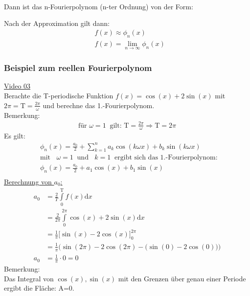 Dann ist das n-Fourierpolynom (n-ter Ordnung) von der Form:\\
\begin{center}
\end{center}
Nach der Approximation gilt dann:\\
\begin{align*}
&f(x)\approx \phi_n(x)\\
&f(x)=\lim\limits_ {n\to\infty}\phi_n(x)
\end{align*}
\addtocounter{subsubsection}{1}
\subsubsection{ Beispiel zum reellen Fourierpolynom}
\href{https://youtu.be/EsfssnLs8To}{Video 03}\\
Berachte die T-periodische Funktion $ f(x)=\cos(x)+2\sin(x) $ mit $ 2\pi=\mathrm{T}=\frac{2\pi}{\omega} $ und berechne das 1.-Fourierpolynom.\\
Bemerkung:\\
\begin{align*}
\text{für } \omega=1 \;\;\text{gilt: } \mathrm{T}=\frac{2\pi}{\omega}\Rightarrow \mathrm{T}=2\pi
\end{align*}
Es gilt:\\
\begin{align*}
& \phi_n(x)=\frac{a_0}{2} +\sum\limits_{k=1}^{n}a_k\cos(k\omega x)+b_k\sin(k\omega x)\\
&\text{mit }\;\;\omega=1 \;\;\text{und }\;\;k=1\;\;\text{ergibt sich das 1.-Fourierpolynom: }\\
& \phi_n(x)=\frac{a_0}{2} +a_1\cos(x)+b_1\sin( x)\\
\end{align*}
\underline{Berechnung von $ a_0 $:}\\
\begin{align*}
a_0&=\frac{2}{T}\int\limits_{0}^{\mathrm{T}}f(x)\mathrm{d}x\\
&=\frac{2}{2\pi}\int\limits_{0}^{2\pi} \cos(x)+2\sin(x)\mathrm{d}x\\
&=\frac{1}{\pi}\bigg[\sin(x)-2\cos(x)\bigg]^{2\pi}_0\\
&=\frac{1}{\pi}\bigg(\sin(2\pi)-2\cos(2\pi)-\big(\sin(0)-2\cos(0)\big)\bigg)\\
a_0&=\frac{1}{\pi}\cdot0=0
\end{align*}
Bemerkung:\\
Das Integral von $ \cos(x), \sin(x) $ mit den Grenzen über genau einer Periode ergibt die Fläche: A=0.\\
